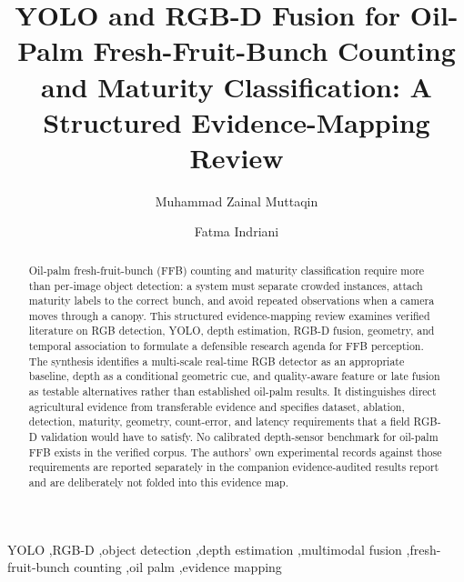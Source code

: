 \documentclass[review]{elsarticle}
\begin{document}
\begin{frontmatter}
\title{YOLO and RGB-D Fusion for Oil-Palm Fresh-Fruit-Bunch Counting and Maturity Classification: A Structured Evidence-Mapping Review}
\author[a]{Muhammad Zainal Muttaqin}
\author[a]{Fatma Indriani}
\begin{abstract}
Oil-palm fresh-fruit-bunch (FFB) counting and maturity classification require
more than per-image object detection: a system must separate crowded instances,
attach maturity labels to the correct bunch, and avoid repeated observations
when a camera moves through a canopy. This structured evidence-mapping review
examines verified literature on RGB detection, YOLO, depth estimation, RGB-D
fusion, geometry, and temporal association to formulate a defensible research
agenda for FFB perception. The synthesis identifies a multi-scale real-time
RGB detector as an appropriate baseline, depth as a conditional geometric cue,
and quality-aware feature or late fusion as testable alternatives rather than
established oil-palm results. It distinguishes direct agricultural evidence
from transferable evidence and specifies dataset, ablation, detection, maturity,
geometry, count-error, and latency requirements that a field RGB-D validation
would have to satisfy. No calibrated depth-sensor benchmark for oil-palm FFB
exists in the verified corpus. The authors' own experimental records against
those requirements are reported separately in the companion evidence-audited
results report and are deliberately not folded into this evidence map.
\end{abstract}
\begin{keyword}YOLO \sep RGB-D \sep object detection \sep depth estimation \sep multimodal fusion \sep fresh-fruit-bunch counting \sep oil palm \sep evidence mapping\end{keyword}
\end{frontmatter}



\end{document}
